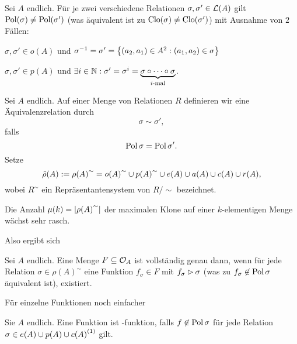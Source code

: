 \documentclass{book}
\begin{document}
\begin{remark}
    Sei $A$ endlich. Für je zwei verschiedene Relationen $\sigma, \sigma'\in\mathcal{L}(A)$ gilt $\mathop\mathrm{Pol}(\sigma)\neq \mathop\mathrm{Pol}(\sigma')$ (was äquivalent ist zu $\mathrm{Clo}(\sigma)\neq\mathrm{Clo}(\sigma')$) mit Ausnahme von $2$ Fällen:
    \begin{statements}
            \item $\sigma,\sigma'\in o(A)$ und $\sigma^{-1}=\sigma'=\left\{(a_2,a_1)\in A^2:(a_1,a_2)\in \sigma\right\}$
            \item $\sigma,\sigma'\in p(A)$ und $\exists i\in \mathbb{N}:\sigma'=\sigma^i=\underbrace{\sigma\circ \cdots \circ\sigma}_{\textrm{$i$-mal}}$.
    \end{statements}
\end{remark}

\begin{definition}
    Sei $A$ endlich. Auf einer Menge von Relationen $R$ definieren wir eine Äquivalenzrelation durch
    $$
    \sigma\sim\sigma',
    $$
    falls
    $$
    \mathop\mathrm{Pol}\sigma = \mathop\mathrm{Pol}\sigma'.
    $$
    Setze
    $$
    \tilde\rho(A):={\rho(A)}^{\sim}={o(A)}^{\sim}\cup {p(A)}^{\sim}\cup e(A)\cup a(A)\cup c(A)\cup r(A),
    $$
    wobei $R^{\sim}$ ein Repräsentantensystem von $R/\sim$ bezeichnet.
\end{definition}

\begin{remark}
    Die Anzahl $\mu(k)=\left|{\rho(A)}^{\sim}\right|$ der maximalen Klone auf einer $k$-elementigen Menge wächst sehr rasch.
\end{remark}

Also ergibt sich
%
\begin{corollary}
    Sei $A$ endlich. Eine Menge $F\subseteq \mathcal{O}_A$ ist vollständig genau dann, wenn für jede Relation $\sigma\in{\rho(A)}^{\sim}$ eine Funktion $f_\sigma\in F$ mit $f_\sigma\rhd\sigma$ (was zu $f_\sigma\not\in \mathop\mathrm{Pol}\sigma$ äquivalent ist), existiert.
\end{corollary}

Für einzelne Funktionen noch einfacher

\begin{proposition}
    Sie $A$ endlich. Eine Funktion ist -funktion, falls $f\not\in\mathop\mathrm{Pol}\sigma$ für jede Relation $\sigma\in e(A)\cup p(A)\cup {c(A)}^{(1)}$ gilt.
\end{proposition}
\end{document}
